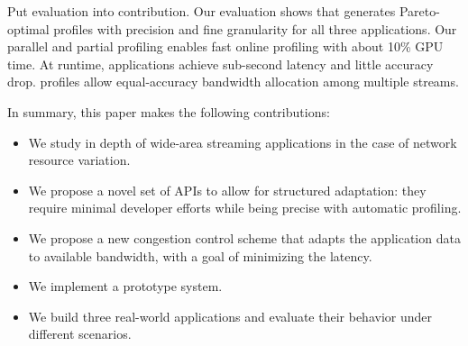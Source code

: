 Put evaluation into contribution. Our evaluation shows that \sysname{} generates
Pareto-optimal profiles with precision and fine granularity for all three
applications. Our parallel and partial profiling enables fast online profiling
with about 10\% GPU time. At runtime, \sysname{} applications achieve sub-second
latency and little accuracy drop. \sysname{} profiles allow equal-accuracy
bandwidth allocation among multiple streams.

In summary, this paper makes the following contributions:

\begin{itemize}[leftmargin=16pt]
\item We study in depth of wide-area streaming applications in the case of
  network resource variation.
\item We propose a novel set of APIs to allow for structured adaptation: they
  require minimal developer efforts while being precise with automatic
  profiling.
\item We propose a new congestion control scheme that adapts the application
  data to available bandwidth, with a goal of minimizing the latency.
\item We implement a prototype system.
\item We build three real-world applications and evaluate their behavior
  under different scenarios.
\end{itemize}

\newpage

